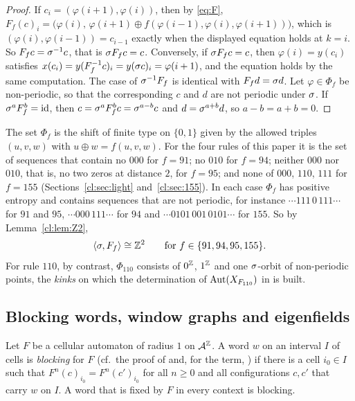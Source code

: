 \begin{proof}
If $c_i=(\varphi(i+1),\varphi(i))$, then by \eqref{eq:F}, $F_f(c)_i=\bigl(\varphi(i),\,\varphi(i+1)\oplus f(\varphi(i-1),\varphi(i),\varphi(i+1))\bigr)$, which is $(\varphi(i),\varphi(i-1))=c_{i-1}$ exactly when the displayed equation holds at $k=i$. So $F_fc=\sigma^{-1}c$, that is $\sigma F_fc=c$. Conversely, if $\sigma F_fc=c$, then $\varphi(i)=y(c_i)$ satisfies $x(c_i)=y(F_f^{-1}c)_i=y(\sigma c)_i=\varphi(i+1)$, and the equation holds by the same computation. The case of $\sigma^{-1}F_f$ is identical with $F_fd=\sigma d$. Let $\varphi\in\Phi_f$ be non-periodic, so that the corresponding $c$ and $d$ are not periodic under $\sigma$. If $\sigma^aF_f^b=\mathrm{id}$, then $c=\sigma^aF_f^bc=\sigma^{a-b}c$ and $d=\sigma^{a+b}d$, so $a-b=a+b=0$.
\end{proof}

The set $\Phi_f$ is the shift of finite type on $\{0,1\}$ given by the allowed triples $(u,v,w)$ with $u\oplus w=f(u,v,w)$. For the four rules of this paper it is the set of sequences that contain no $000$ for $f=91$; no $010$ for $f=94$; neither $000$ nor $010$, that is, no two zeros at distance $2$, for $f=95$; and none of $000$, $110$, $111$ for $f=155$ (Sections~\ref{cl:sec:light} and~\ref{cl:sec:155}). In each case $\Phi_f$ has positive entropy and contains sequences that are not periodic, for instance $\cdots111\,0\,111\cdots$ for $91$ and $95$, $\cdots000\,111\cdots$ for $94$ and $\cdots0101\,001\,0101\cdots$ for $155$. So by Lemma~\ref{cl:lem:Z2},
\[
\langle\sigma,F_f\rangle\cong\mathbb{Z}^2\qquad\text{for }f\in\{91,94,95,155\}.
\]
For rule $110$, by contrast, $\Phi_{110}$ consists of $0^{\mathbb{Z}}$, $1^{\mathbb{Z}}$ and one $\sigma$-orbit of non-periodic points, the \emph{kinks} on which the determination of $\operatorname{Aut}(X_{F_{110}})$ in \cite{PaperA} is built.

\subsection{Blocking words, window graphs and eigenfields}\label{sec:blocking}
Let $F$ be a cellular automaton of radius $1$ on $\mathcal{A}^{\mathbb{Z}}$. A word $w$ on an interval $I$ of cells is \emph{blocking} for $F$ (cf.\ the proof of \cite[Theorem~3]{Kurka1997} and, for the term, \cite[Section~2.2]{BT2000}) if there is a cell $i_0\in I$ such that $F^n(c)_{i_0}=F^n(c')_{i_0}$ for all $n\ge0$ and all configurations $c,c'$ that carry $w$ on $I$. A word that is fixed by $F$ in every context is blocking.

